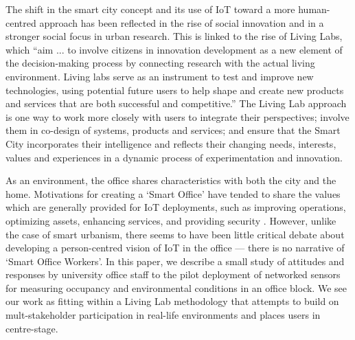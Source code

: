 The shift in the smart city concept and its use of IoT toward a more
human-centred approach has been reflected in the rise of social
innovation and in a stronger social focus in urban research. This is
linked to the rise of Living Labs, which “aim ... to involve citizens
in innovation development as a new element of the decision-making
process by connecting research with the actual living
environment. Living labs serve as an instrument to test and improve
new technologies, using potential future users to help shape and
create new products and services that are both successful and
competitive.”  The Living Lab approach is one way to work more closely
with users to integrate their perspectives; involve them in co-design
of systems, products and services; and ensure that the Smart City
incorporates their intelligence and reflects their changing needs,
interests, values and experiences in a dynamic process of
experimentation and innovation.

As an environment, the office shares characteristics with both the
city and the home. Motivations for creating a `Smart Office' have
tended to share the values which are generally provided for IoT
deployments, such as improving operations, optimizing assets, enhancing
services, and providing security
\cite{Heidt-2016-PGFT,Gaur-2015-SCAA,Gubbi-2013-IOT}. However, unlike
the case of smart urbanism, there seems to have been little
critical debate about developing a person-centred vision of IoT in the
office --- there is no narrative of `Smart Office Workers'.  In this
paper, we describe a small study of attitudes and responses by university office
staff to the pilot deployment of networked sensors for measuring
occupancy and environmental conditions in an office block. 
We see our work as fitting within a Living Lab methodology that
attempts to build on mult-stakeholder participation in real-life
environments and places users in centre-stage.
 





